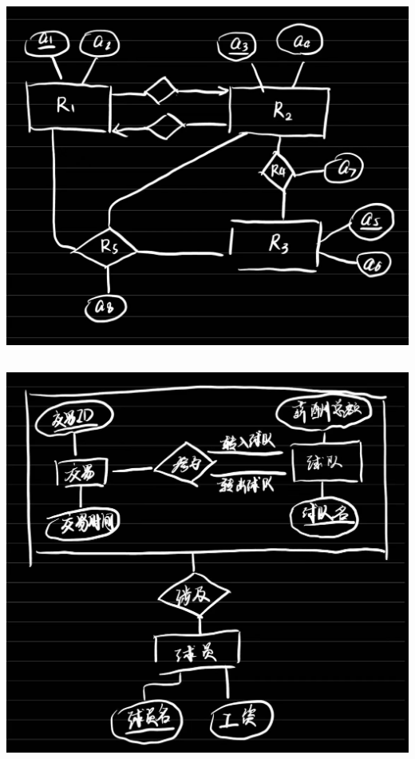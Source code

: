 \documentclass[UTF8]{ctexart}
\begin{document}
\includegraphics[width=\textwidth]{./pics/2.jpeg}

\subsection{}

\includegraphics[width=\textwidth]{./pics/3.jpeg}

\subsection{}
\end{document}
